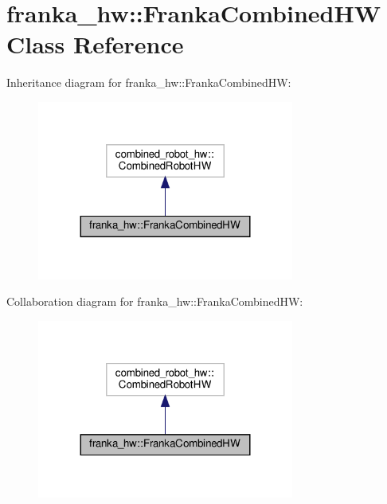 \hypertarget{classfranka__hw_1_1_franka_combined_h_w}{}\section{franka\+\_\+hw\+:\+:Franka\+Combined\+HW Class Reference}
\label{classfranka__hw_1_1_franka_combined_h_w}


Inheritance diagram for franka\+\_\+hw\+:\+:Franka\+Combined\+HW\+:
\nopagebreak
\begin{figure}[H]
\begin{center}
\leavevmode
\includegraphics[width=239pt]{classfranka__hw_1_1_franka_combined_h_w__inherit__graph}
\end{center}
\end{figure}


Collaboration diagram for franka\+\_\+hw\+:\+:Franka\+Combined\+HW\+:
\nopagebreak
\begin{figure}[H]
\begin{center}
\leavevmode
\includegraphics[width=239pt]{classfranka__hw_1_1_franka_combined_h_w__coll__graph}
\end{center}
\end{figure}
